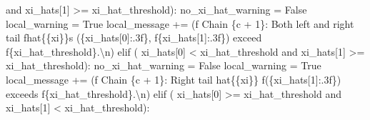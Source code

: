 \documentclass[
  letterpaper,
  DIV=11,
  numbers=noendperiod]{scrartcl}
\newenvironment{Shaded}{\begin{snugshade}}{\end{snugshade}}
\newcommand{\CharTok}[1]{\textcolor[rgb]{0.13,0.47,0.30}{#1}}
\newcommand{\ControlFlowTok}[1]{\textcolor[rgb]{0.00,0.23,0.31}{#1}}
\newcommand{\DecValTok}[1]{\textcolor[rgb]{0.68,0.00,0.00}{#1}}
\newcommand{\KeywordTok}[1]{\textcolor[rgb]{0.00,0.23,0.31}{#1}}
\newcommand{\NormalTok}[1]{\textcolor[rgb]{0.00,0.23,0.31}{#1}}
\newcommand{\OperatorTok}[1]{\textcolor[rgb]{0.37,0.37,0.37}{#1}}
\newcommand{\SpecialCharTok}[1]{\textcolor[rgb]{0.37,0.37,0.37}{#1}}
\newcommand{\SpecialStringTok}[1]{\textcolor[rgb]{0.13,0.47,0.30}{#1}}
\newcommand{\VariableTok}[1]{\textcolor[rgb]{0.07,0.07,0.07}{#1}}
\begin{document}
\begin{Shaded}
\begin{Highlighting}[]
          \KeywordTok{and}\NormalTok{ xi\_hats[}\DecValTok{1}\NormalTok{] }\OperatorTok{\textgreater{}=}\NormalTok{ xi\_hat\_threshold):}
\NormalTok{        no\_xi\_hat\_warning }\OperatorTok{=} \VariableTok{False}
\NormalTok{        local\_warning }\OperatorTok{=} \VariableTok{True}
\NormalTok{        local\_message }\OperatorTok{+=}\NormalTok{ (}\SpecialStringTok{f\textquotesingle{}  Chain }\SpecialCharTok{\{}\NormalTok{c }\OperatorTok{+} \DecValTok{1}\SpecialCharTok{\}}\SpecialStringTok{: Both left and right tail \textquotesingle{}}
                          \SpecialStringTok{f\textquotesingle{}hat}\CharTok{\{\{}\SpecialStringTok{xi}\CharTok{\}\}}\SpecialStringTok{s (}\SpecialCharTok{\{}\NormalTok{xi\_hats[}\DecValTok{0}\NormalTok{]}\SpecialCharTok{:.3f\}}\SpecialStringTok{, \textquotesingle{}}
                          \SpecialStringTok{f\textquotesingle{}}\SpecialCharTok{\{}\NormalTok{xi\_hats[}\DecValTok{1}\NormalTok{]}\SpecialCharTok{:.3f\}}\SpecialStringTok{) exceed \textquotesingle{}}
                          \SpecialStringTok{f\textquotesingle{}}\SpecialCharTok{\{}\NormalTok{xi\_hat\_threshold}\SpecialCharTok{\}}\SpecialStringTok{.}\CharTok{\textbackslash{}n}\SpecialStringTok{\textquotesingle{}}\NormalTok{)}
      \ControlFlowTok{elif}\NormalTok{ (    xi\_hats[}\DecValTok{0}\NormalTok{] }\OperatorTok{\textless{}}\NormalTok{ xi\_hat\_threshold }
            \KeywordTok{and}\NormalTok{ xi\_hats[}\DecValTok{1}\NormalTok{] }\OperatorTok{\textgreater{}=}\NormalTok{ xi\_hat\_threshold):}
\NormalTok{        no\_xi\_hat\_warning }\OperatorTok{=} \VariableTok{False}
\NormalTok{        local\_warning }\OperatorTok{=} \VariableTok{True}
\NormalTok{        local\_message }\OperatorTok{+=}\NormalTok{ (}\SpecialStringTok{f\textquotesingle{}  Chain }\SpecialCharTok{\{}\NormalTok{c }\OperatorTok{+} \DecValTok{1}\SpecialCharTok{\}}\SpecialStringTok{: Right tail hat}\CharTok{\{\{}\SpecialStringTok{xi}\CharTok{\}\}}\SpecialStringTok{ \textquotesingle{}}
                          \SpecialStringTok{f\textquotesingle{}(}\SpecialCharTok{\{}\NormalTok{xi\_hats[}\DecValTok{1}\NormalTok{]}\SpecialCharTok{:.3f\}}\SpecialStringTok{) exceeds \textquotesingle{}}
                          \SpecialStringTok{f\textquotesingle{}}\SpecialCharTok{\{}\NormalTok{xi\_hat\_threshold}\SpecialCharTok{\}}\SpecialStringTok{.}\CharTok{\textbackslash{}n}\SpecialStringTok{\textquotesingle{}}\NormalTok{)}
      \ControlFlowTok{elif}\NormalTok{ (    xi\_hats[}\DecValTok{0}\NormalTok{] }\OperatorTok{\textgreater{}=}\NormalTok{ xi\_hat\_threshold }
            \KeywordTok{and}\NormalTok{ xi\_hats[}\DecValTok{1}\NormalTok{] }\OperatorTok{\textless{}}\NormalTok{ xi\_hat\_threshold):}

\end{Highlighting}
\end{Shaded}
\end{document}
